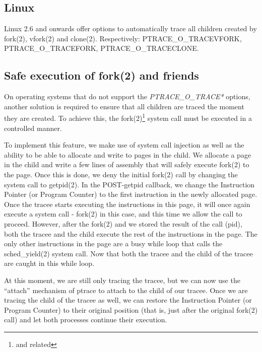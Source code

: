 \documentclass[a4paper, twoside, 10pt]{report}
\begin{document}
\subsection{Linux}

Linux 2.6 and onwards offer options to automatically trace all children
created by fork(2), vfork(2) and clone(2). Respectively:
PTRACE\_O\_TRACEVFORK, PTRACE\_O\_TRACEFORK, PTRACE\_O\_TRACECLONE.


\subsection{Safe execution of fork(2) and friends}

On operating systems that do not support the \textit{PTRACE\_O\_TRACE*} options,
another solution is required to ensure that all children are traced the moment
they are created. To achieve this, the fork(2)\footnote{and related} system call
must be executed in a controlled manner.

To implement this feature, we make use of system call injection as well as the
ability to be able to allocate and write to pages in the child. We allocate a
page in the child and write a few lines of assembly that will safely execute
fork(2) to the page. Once this is done, we deny the initial fork(2) call by
changing the system call to getpid(2). In the POST-getpid callback, we change
the Instruction Pointer (or Program Counter) to the first instruction in the
newly allocated page. Once the tracee starts executing the instructions in this
page, it will once again execute a system call - fork(2) in this case, and this
time we allow the call to proceed. However, after the fork(2) and we stored the
result of the call (pid), both the tracee and the child execute the rest of the
instructions in the page. The only other instructions in the page are a busy
while loop that calls the sched\_yield(2) system call. Now that both the tracee
and the child of the tracee are caught in this while loop.

At this moment, we are still only tracing the tracee, but we can now use the
``attach'' mechanism of ptrace to attach to the child of our tracee. Once we are
tracing the child of the tracee as well, we can restore the Instruction Pointer
(or Program Counter) to their original position (that is, just after the
original fork(2) call) and let both processes continue their execution.

\end{document}
